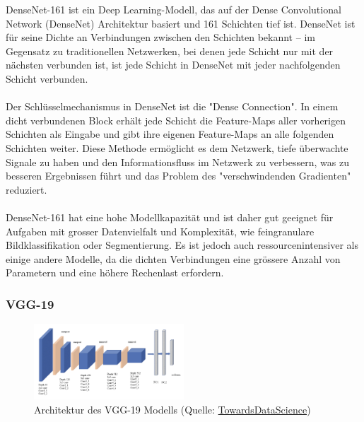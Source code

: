 \documentclass{article}
\begin{document}
DenseNet-161 \cite{huang_densely_2018} ist ein Deep Learning-Modell, das auf der Dense Convolutional Network (DenseNet) Architektur basiert und 161 Schichten tief ist. DenseNet ist für seine Dichte an Verbindungen zwischen den Schichten bekannt – im Gegensatz zu traditionellen Netzwerken, bei denen jede Schicht nur mit der nächsten verbunden ist, ist jede Schicht in DenseNet mit jeder nachfolgenden Schicht verbunden.\\\\
Der Schlüsselmechanismus in DenseNet ist die "Dense Connection". In einem dicht verbundenen Block erhält jede Schicht die Feature-Maps aller vorherigen Schichten als Eingabe und gibt ihre eigenen Feature-Maps an alle folgenden Schichten weiter. Diese Methode ermöglicht es dem Netzwerk, tiefe überwachte Signale zu haben und den Informationsfluss im Netzwerk zu verbessern, was zu besseren Ergebnissen führt und das Problem des "verschwindenden Gradienten" reduziert.\\\\
DenseNet-161 hat eine hohe Modellkapazität und ist daher gut geeignet für Aufgaben mit grosser Datenvielfalt und Komplexität, wie feingranulare Bildklassifikation oder Segmentierung. Es ist jedoch auch ressourcenintensiver als einige andere Modelle, da die dichten Verbindungen eine grössere Anzahl von Parametern und eine höhere Rechenlast erfordern.

\newpage

\subsubsection{VGG-19}
\begin{figure}[!h]
    \centering
    \includegraphics[width=0.5\textwidth]{images/model_architecture/vgg19.png}
    \caption{\label{fig:resnet_50_architecture}Architektur des VGG-19 Modells (Quelle: \href{https://towardsdatascience.com/extract-features-visualize-filters-and-feature-maps-in-vgg16-and-vgg19-cnn-models-d2da6333edd0}{TowardsDataScience})}
\end{figure}
\end{document}
